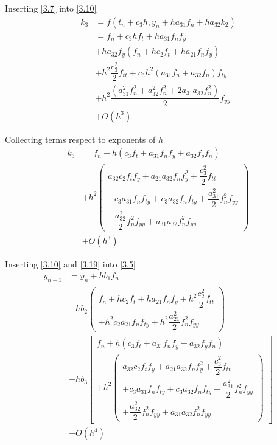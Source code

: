 \documentclass[a4paper,oneside]{book}
\numberwithin{equation}{chapter}
\begin{document}
Inserting \eqref{3.7} into \eqref{3.10}
\begin{align}
{k_3} &= f\left( {{t_n} + {c_3}h,{y_n} + h{a_{31}}{f_n} + h{a_{32}}{k_2}} \right)\\
 &= {f_n} + {c_3}h{f_t} + h{a_{31}}{f_n}{f_y}\\
 &+ h{a_{32}}{f_y}\left( {{f_n} + h{c_2}{f_t} + h{a_{21}}{f_n}{f_y}} \right)\\
 &+ {h^2}\dfrac{{c_3^2}}{2}{f_{tt}} + {c_3}{h^2}\left( {{a_{31}}{f_n} + {a_{32}}{f_n}} \right){f_{ty}}\\
 &+ {h^2}\dfrac{{\left( {a_{31}^2f_n^2 + a_{32}^2f_n^2 + 2{a_{31}}{a_{32}}f_n^2} \right)}}{2}{f_{yy}}\\
 &+ O\left( {{h^3}} \right)
\end{align}

Collecting terms respect to exponents of $h$
\begin{align}
{k_3}  &= {f_n} + h\left( {{c_3}{f_t} + {a_{31}}{f_n}{f_y} + {a_{32}}{f_y}{f_n}} \right)\\
 &+ {h^2}\left( \begin{array}{l}
{a_{32}}{c_2}{f_t}{f_y} + {a_{21}}{a_{32}}{f_n}f_y^2 + \dfrac{{c_3^2}}{2}{f_{tt}}\\
 + {c_3}{a_{31}}{f_n}{f_{ty}} + {c_3}{a_{32}}{f_n}{f_{ty}} + \dfrac{{a_{31}^2}}{2}f_n^2{f_{yy}}\\
 + \dfrac{{a_{32}^2}}{2}f_n^2{f_{yy}} + {a_{31}}{a_{32}}f_n^2{f_{yy}}
\end{array} \right)\\
 &+ O\left( {{h^3}} \right)
 \label{3.19}
\end{align}

Inserting \eqref{3.10} and \eqref{3.19} into \eqref{3.5}
\begin{align}
{{y_{n + 1}}} &= {{y_n}} + h{b_1}{f_n}\\
 &+ h{b_2}\left( \begin{array}{l}
{f_n} + h{c_2}{f_t} + h{a_{21}}{f_n}{f_y} + {h^2}\dfrac{{c_2^2}}{2}{f_{tt}}\\
 + {h^2}{c_2}{a_{21}}{f_n}{f_{ty}} + {h^2}\dfrac{{a_{21}^2}}{2}f_n^2{f_{yy}}
\end{array} \right)\\
 &+ h{b_3}\left[ \begin{array}{l}
{f_n} + h\left( {{c_3}{f_t} + {a_{31}}{f_n}{f_y} + {a_{32}}{f_y}{f_n}} \right)\\
 + {h^2}\left( \begin{array}{l}
{a_{32}}{c_2}{f_t}{f_y} + {a_{21}}{a_{32}}{f_n}f_y^2 + \dfrac{{c_3^2}}{2}{f_{tt}}\\
 + {c_3}{a_{31}}{f_n}{f_{ty}} + {c_3}{a_{32}}{f_n}{f_{ty}} + \dfrac{{a_{31}^2}}{2}f_n^2{f_{yy}}\\
 + \dfrac{{a_{32}^2}}{2}f_n^2{f_{yy}} + {a_{31}}{a_{32}}f_n^2{f_{yy}}
\end{array} \right)
\end{array} \right]\\
 &+ O\left( {{h^4}} \right)
\end{align}
\end{document}
